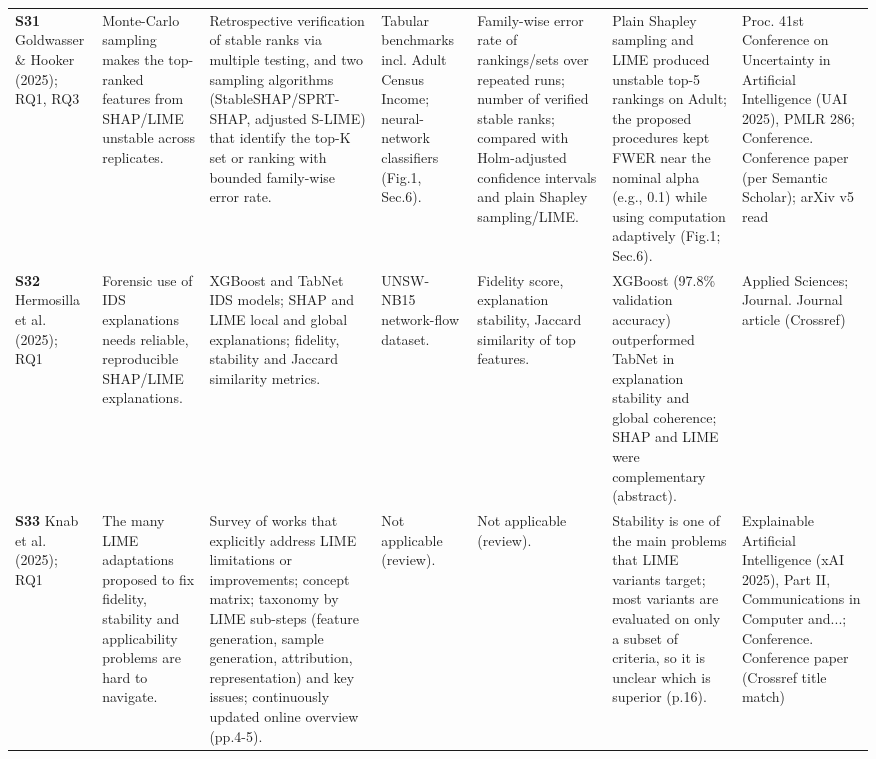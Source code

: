 \begin{longtable}{@{}P{1.55cm}P{2.9cm}P{4.5cm}P{3.2cm}P{3.4cm}P{4.6cm}P{3.6cm}@{}}
\textbf{S31} \cite{S31} Goldwasser \& Hooker (2025); RQ1, RQ3 & Monte-Carlo sampling makes the top-ranked features from SHAP/\allowbreak{}LIME unstable across replicates. & Retrospective verification of stable ranks via multiple testing, and two sampling algorithms (StableSHAP/\allowbreak{}SPRT-SHAP, adjusted S-LIME) that identify the top-K set or ranking with bounded family-wise error rate. & Tabular benchmarks incl. Adult Census Income; neural-network classifiers (Fig.1, Sec.6). & Family-wise error rate of rankings/\allowbreak{}sets over repeated runs; number of verified stable ranks; compared with Holm-adjusted confidence intervals and plain Shapley sampling/\allowbreak{}LIME. & Plain Shapley sampling and LIME produced unstable top-5 rankings on Adult; the proposed procedures kept FWER near the nominal alpha (e.g., 0.1) while using computation adaptively (Fig.1; Sec.6). & Proc. 41st Conference on Uncertainty in Artificial Intelligence (UAI 2025), PMLR 286; Conference. Conference paper (per Semantic Scholar); arXiv v5 read \\
\textbf{S32} \cite{S32} Hermosilla et al. (2025); RQ1 & Forensic use of IDS explanations needs reliable, reproducible SHAP/\allowbreak{}LIME explanations. & XGBoost and TabNet IDS models; SHAP and LIME local and global explanations; fidelity, stability and Jaccard similarity metrics. & UNSW-NB15 network-flow dataset. & Fidelity score, explanation stability, Jaccard similarity of top features. & XGBoost (97.8\% validation accuracy) outperformed TabNet in explanation stability and global coherence; SHAP and LIME were complementary (abstract). & Applied Sciences; Journal. Journal article (Crossref) \\
\textbf{S33} \cite{S33} Knab et al. (2025); RQ1 & The many LIME adaptations proposed to fix fidelity, stability and applicability problems are hard to navigate. & Survey of works that explicitly address LIME limitations or improvements; concept matrix; taxonomy by LIME sub-steps (feature generation, sample generation, attribution, representation) and key issues; continuously updated online overview (pp.4-5). & Not applicable (review). & Not applicable (review). & Stability is one of the main problems that LIME variants target; most variants are evaluated on only a subset of criteria, so it is unclear which is superior (p.16). & Explainable Artificial Intelligence (xAI 2025), Part II, Communications in Computer and...; Conference. Conference paper (Crossref title match) \\

\end{longtable}
